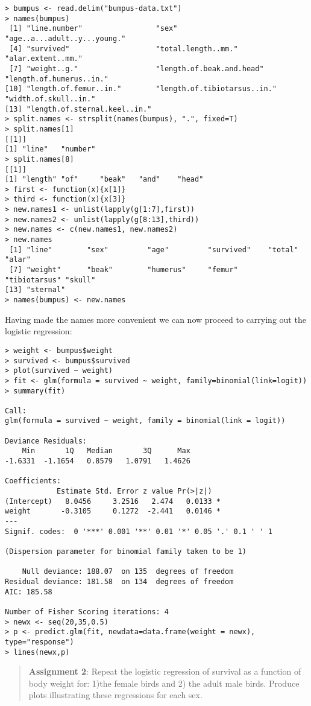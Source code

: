 \begin{lstlisting}
> bumpus <- read.delim("bumpus-data.txt")
> names(bumpus)
 [1] "line.number"                 "sex"                         "age..a...adult..y...young." 
 [4] "survived"                    "total.length..mm."           "alar.extent..mm."           
 [7] "weight..g."                  "length.of.beak.and.head"     "length.of.humerus..in."     
[10] "length.of.femur..in."        "length.of.tibiotarsus..in."  "width.of.skull..in."        
[13] "length.of.sternal.keel..in."
> split.names <- strsplit(names(bumpus), ".", fixed=T)
> split.names[1]
[[1]]
[1] "line"   "number"
> split.names[8]
[[1]]
[1] "length" "of"     "beak"   "and"    "head"  
> first <- function(x){x[1]}
> third <- function(x){x[3]}
> new.names1 <- unlist(lapply(g[1:7],first))
> new.names2 <- unlist(lapply(g[8:13],third))
> new.names <- c(new.names1, new.names2)
> new.names
 [1] "line"        "sex"         "age"         "survived"    "total"       "alar"       
 [7] "weight"      "beak"        "humerus"     "femur"       "tibiotarsus" "skull"      
[13] "sternal"   
> names(bumpus) <- new.names
\end{lstlisting}
Having made the names more convenient we can now proceed to carrying out
the logistic regression:

\begin{lstlisting}
> weight <- bumpus$weight
> survived <- bumpus$survived
> plot(survived ~ weight)
> fit <- glm(formula = survived ~ weight, family=binomial(link=logit))
> summary(fit)

Call:
glm(formula = survived ~ weight, family = binomial(link = logit))

Deviance Residuals: 
    Min       1Q   Median       3Q      Max  
-1.6331  -1.1654   0.8579   1.0791   1.4626  

Coefficients:
            Estimate Std. Error z value Pr(>|z|)  
(Intercept)   8.0456     3.2516   2.474   0.0133 *
weight       -0.3105     0.1272  -2.441   0.0146 *
---
Signif. codes:  0 '***' 0.001 '**' 0.01 '*' 0.05 '.' 0.1 ' ' 1 

(Dispersion parameter for binomial family taken to be 1)

    Null deviance: 188.07  on 135  degrees of freedom
Residual deviance: 181.58  on 134  degrees of freedom
AIC: 185.58

Number of Fisher Scoring iterations: 4
> newx <- seq(20,35,0.5)
> p <- predict.glm(fit, newdata=data.frame(weight = newx), type="response")
> lines(newx,p)
\end{lstlisting}
\begin{quote}
\textbf{Assignment 2}: Repeat the logistic regression of survival as a
function of body weight for: 1)the female birds and 2) the adult male
birds. Produce plots illustrating these regressions for each sex.

\end{quote}
